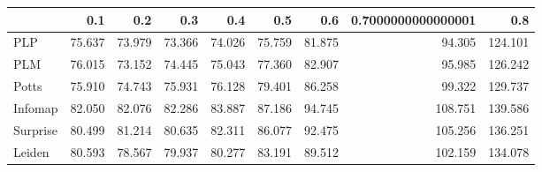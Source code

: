 \begin{tabular}{lrrrrrrrr}
\toprule
{} &    0.1 &    0.2 &    0.3 &    0.4 &    0.5 &    0.6 & 0.7000000000000001 &     0.8 \\
\midrule
PLP      & 75.637 & 73.979 & 73.366 & 74.026 & 75.759 & 81.875 &             94.305 & 124.101 \\
PLM      & 76.015 & 73.152 & 74.445 & 75.043 & 77.360 & 82.907 &             95.985 & 126.242 \\
Potts    & 75.910 & 74.743 & 75.931 & 76.128 & 79.401 & 86.258 &             99.322 & 129.737 \\
Infomap  & 82.050 & 82.076 & 82.286 & 83.887 & 87.186 & 94.745 &            108.751 & 139.586 \\
Surprise & 80.499 & 81.214 & 80.635 & 82.311 & 86.077 & 92.475 &            105.256 & 136.251 \\
Leiden   & 80.593 & 78.567 & 79.937 & 80.277 & 83.191 & 89.512 &            102.159 & 134.078 \\
\bottomrule
\end{tabular}
